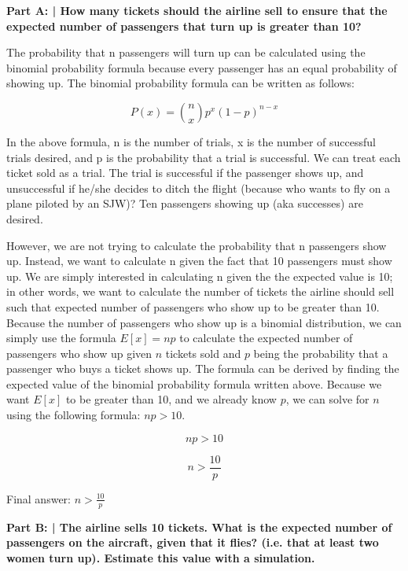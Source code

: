 \documentclass{article}
\begin{document}
 \textbf{Part A: | How many tickets should the airline sell to ensure that the expected number of passengers that turn up is greater than 10?}\newline
 
 The probability that n passengers will turn up can be calculated using the binomial probability formula because every passenger has an equal probability of showing up. The binomial probability formula can be written as follows:
 
 \begin{displaymath}
    P(x)={n \choose x}p^x(1-p)^{n-x}
 \end{displaymath}
 
 In the above formula, n is the number of trials, x is the number of successful trials desired, and p is the probability that a trial is successful. We can treat each ticket sold as a trial. The trial is successful if the passenger shows up, and unsuccessful if he/she decides to ditch the flight (because who wants to fly on a plane piloted by an SJW)? Ten passengers showing up (aka successes) are desired.
 
 However, we are not trying to calculate the probability that n passengers show up. Instead, we want to calculate n given the fact that 10 passengers must show up. We are simply interested in calculating n given the the expected value is 10; in other words, we want to calculate the number of tickets the airline should sell such that expected number of passengers who show up to be greater than 10. Because the number of passengers who show up is a binomial distribution, we can simply use the formula $E[x]=np$ to calculate the expected number of passengers who show up given $n$ tickets sold and $p$ being the probability that a passenger who buys a ticket shows up. The formula can be derived by finding the expected value of the binomial probability formula written above. Because we want $E[x]$ to be greater than 10, and we already know $p$, we can solve for $n$ using the following formula: $np>10$.
 
 \begin{displaymath}
    np > 10
 \end{displaymath}
 
 \begin{displaymath}
    n > \frac{10}{p}
 \end{displaymath}
 
 Final answer: $n>\frac{10}{p}$\newline
 
 \textbf{Part B: | The airline sells 10 tickets. What is the expected number of passengers on the aircraft, given that it flies? (i.e. that at least two women turn up). Estimate this value with a simulation.}\newline
 
\end{document}
